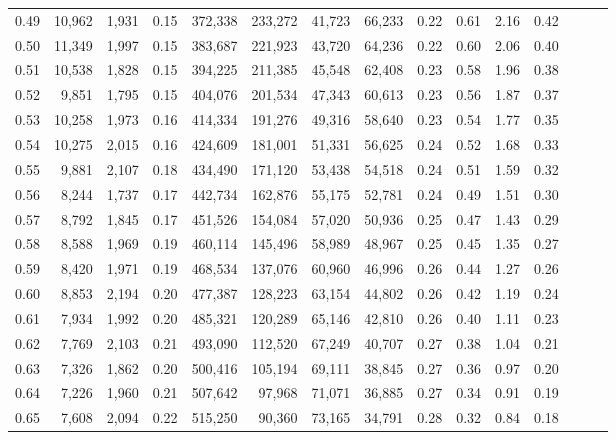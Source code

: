 \begin{tabular}{rrrrrrrrrrrrrrr}
0.49 &  10,962 &  1,931 &  0.15 &  372,338 &  233,272 &   41,723 &   66,233 &  0.22 &  0.61 &  2.16 &      0.42 \\
0.50 &  11,349 &  1,997 &  0.15 &  383,687 &  221,923 &   43,720 &   64,236 &  0.22 &  0.60 &  2.06 &      0.40 \\
0.51 &  10,538 &  1,828 &  0.15 &  394,225 &  211,385 &   45,548 &   62,408 &  0.23 &  0.58 &  1.96 &      0.38 \\
0.52 &   9,851 &  1,795 &  0.15 &  404,076 &  201,534 &   47,343 &   60,613 &  0.23 &  0.56 &  1.87 &      0.37 \\
0.53 &  10,258 &  1,973 &  0.16 &  414,334 &  191,276 &   49,316 &   58,640 &  0.23 &  0.54 &  1.77 &      0.35 \\
0.54 &  10,275 &  2,015 &  0.16 &  424,609 &  181,001 &   51,331 &   56,625 &  0.24 &  0.52 &  1.68 &      0.33 \\
0.55 &   9,881 &  2,107 &  0.18 &  434,490 &  171,120 &   53,438 &   54,518 &  0.24 &  0.51 &  1.59 &      0.32 \\
0.56 &   8,244 &  1,737 &  0.17 &  442,734 &  162,876 &   55,175 &   52,781 &  0.24 &  0.49 &  1.51 &      0.30 \\
0.57 &   8,792 &  1,845 &  0.17 &  451,526 &  154,084 &   57,020 &   50,936 &  0.25 &  0.47 &  1.43 &      0.29 \\
0.58 &   8,588 &  1,969 &  0.19 &  460,114 &  145,496 &   58,989 &   48,967 &  0.25 &  0.45 &  1.35 &      0.27 \\
0.59 &   8,420 &  1,971 &  0.19 &  468,534 &  137,076 &   60,960 &   46,996 &  0.26 &  0.44 &  1.27 &      0.26 \\
0.60 &   8,853 &  2,194 &  0.20 &  477,387 &  128,223 &   63,154 &   44,802 &  0.26 &  0.42 &  1.19 &      0.24 \\
0.61 &   7,934 &  1,992 &  0.20 &  485,321 &  120,289 &   65,146 &   42,810 &  0.26 &  0.40 &  1.11 &      0.23 \\
0.62 &   7,769 &  2,103 &  0.21 &  493,090 &  112,520 &   67,249 &   40,707 &  0.27 &  0.38 &  1.04 &      0.21 \\
0.63 &   7,326 &  1,862 &  0.20 &  500,416 &  105,194 &   69,111 &   38,845 &  0.27 &  0.36 &  0.97 &      0.20 \\
0.64 &   7,226 &  1,960 &  0.21 &  507,642 &   97,968 &   71,071 &   36,885 &  0.27 &  0.34 &  0.91 &      0.19 \\
0.65 &   7,608 &  2,094 &  0.22 &  515,250 &   90,360 &   73,165 &   34,791 &  0.28 &  0.32 &  0.84 &      0.18 \\

\end{tabular}
